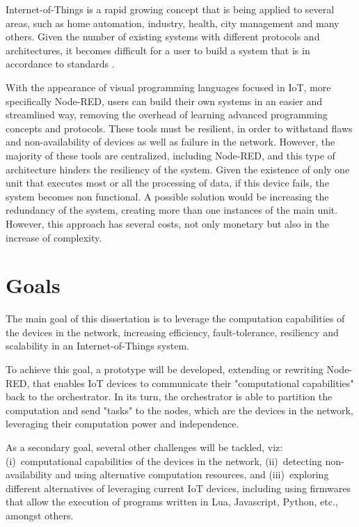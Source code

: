 Internet-of-Things is a rapid growing concept that is being applied to several areas, such as home automation, industry, health, city management and many others. Given the number of existing systems with different protocols and architectures, it becomes difficult for a user to build a system that is in accordance to standards \cite{standard-iot}. 

With the appearance of visual programming languages focused in IoT, more specifically Node-RED, users can build their own systems in an easier and streamlined way, removing the overhead of learning advanced programming concepts and protocols. These tools must be resilient, in order to withstand flaws and non-availability of devices as well as failure in the network. However, the majority of these tools are centralized, including Node-RED, and this type of architecture hinders the resiliency of the system. Given the existence of only one unit that executes most or all the processing of data, if this device fails, the system becomes non functional. A possible solution would be increasing the redundancy of the system, creating more than one instances of the main unit. However, this approach has several costs, not only monetary but also in the increase of complexity.

\section{Goals} \label{sec:goals}

The main goal of this dissertation is to leverage the computation capabilities of the devices in the network, increasing efficiency, fault-tolerance, resiliency and scalability in an Internet-of-Things system.

To achieve this goal, a prototype will be developed, extending or rewriting Node-RED, that enables IoT devices to communicate their "computational capabilities" back to the orchestrator. In its turn, the orchestrator is able to partition the computation and send "tasks" to the nodes, which are the devices in the network, leveraging their computation power and independence.

As a secondary goal, several other challenges will be tackled, viz: (i)~computational capabilities of the devices in the network, (ii)~detecting non-availability and using alternative computation resources, and (iii)~exploring different alternatives of leveraging current IoT devices, including using firmwares that allow the execution of programs written in Lua, Javascript, Python, etc., amongst others.

